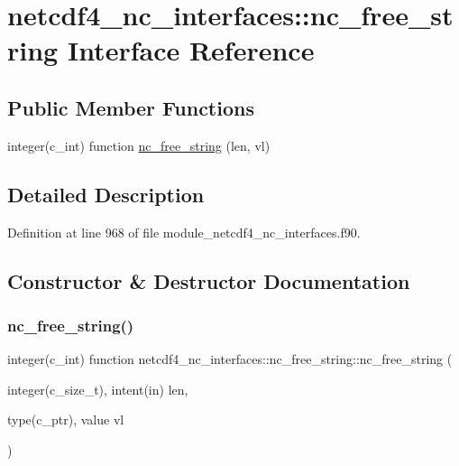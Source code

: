 \hypertarget{interfacenetcdf4__nc__interfaces_1_1nc__free__string}{}\section{netcdf4\+\_\+nc\+\_\+interfaces\+:\+:nc\+\_\+free\+\_\+string Interface Reference}
\label{interfacenetcdf4__nc__interfaces_1_1nc__free__string}
\subsection*{Public Member Functions}
\begin{DoxyCompactItemize}
\item 
integer(c\+\_\+int) function \hyperlink{interfacenetcdf4__nc__interfaces_1_1nc__free__string_aadeab52070edf779af5d9faba212c518}{nc\+\_\+free\+\_\+string} (len, vl)
\end{DoxyCompactItemize}


\subsection{Detailed Description}


Definition at line 968 of file module\+\_\+netcdf4\+\_\+nc\+\_\+interfaces.\+f90.



\subsection{Constructor \& Destructor Documentation}
\mbox{\label{interfacenetcdf4__nc__interfaces_1_1nc__free__string_aadeab52070edf779af5d9faba212c518}} 
\subsubsection{\texorpdfstring{nc\+\_\+free\+\_\+string()}{nc\_free\_string()}}
{\footnotesize\ttfamily integer(c\+\_\+int) function netcdf4\+\_\+nc\+\_\+interfaces\+::nc\+\_\+free\+\_\+string\+::nc\+\_\+free\+\_\+string (\begin{DoxyParamCaption}\item[{integer(c\+\_\+size\+\_\+t), intent(in)}]{len,  }\item[{type(c\+\_\+ptr), value}]{vl }\end{DoxyParamCaption})}



